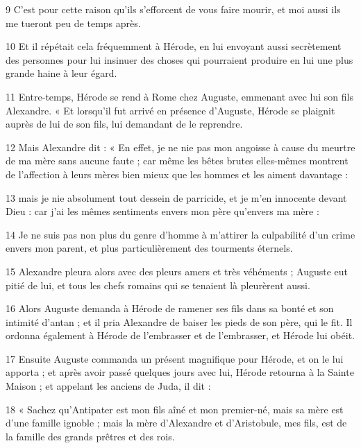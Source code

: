 \par 9 C'est pour cette raison qu'ils s'efforcent de vous faire mourir, et moi aussi ils me tueront peu de temps après.

\par 10 Et il répétait cela fréquemment à Hérode, en lui envoyant aussi secrètement des personnes pour lui insinuer des choses qui pourraient produire en lui une plus grande haine à leur égard.

\par 11 Entre-temps, Hérode se rend à Rome chez Auguste, emmenant avec lui son fils Alexandre. « Et lorsqu'il fut arrivé en présence d'Auguste, Hérode se plaignit auprès de lui de son fils, lui demandant de le reprendre.

\par 12 Mais Alexandre dit : « En effet, je ne nie pas mon angoisse à cause du meurtre de ma mère sans aucune faute ; car même les bêtes brutes elles-mêmes montrent de l'affection à leurs mères bien mieux que les hommes et les aiment davantage :

\par 13 mais je nie absolument tout dessein de parricide, et je m'en innocente devant Dieu : car j'ai les mêmes sentiments envers mon père qu'envers ma mère :

\par 14 Je ne suis pas non plus du genre d'homme à m'attirer la culpabilité d'un crime envers mon parent, et plus particulièrement des tourments éternels.

\par 15 Alexandre pleura alors avec des pleurs amers et très véhéments ; Auguste eut pitié de lui, et tous les chefs romains qui se tenaient là pleurèrent aussi.

\par 16 Alors Auguste demanda à Hérode de ramener ses fils dans sa bonté et son intimité d'antan ; et il pria Alexandre de baiser les pieds de son père, qui le fit. Il ordonna également à Hérode de l'embrasser et de l'embrasser, et Hérode lui obéit.

\par 17 Ensuite Auguste commanda un présent magnifique pour Hérode, et on le lui apporta ; et après avoir passé quelques jours avec lui, Hérode retourna à la Sainte Maison ; et appelant les anciens de Juda, il dit :

\par 18 « Sachez qu'Antipater est mon fils aîné et mon premier-né, mais sa mère est d'une famille ignoble ; mais la mère d'Alexandre et d'Aristobule, mes fils, est de la famille des grands prêtres et des rois.

